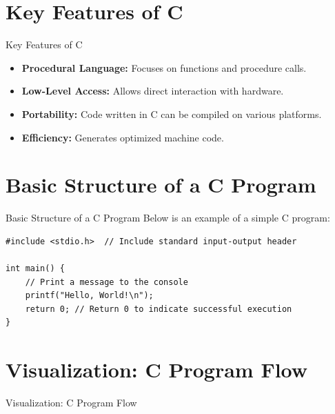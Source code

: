 \documentclass{beamer}
\begin{document}
\section{Key Features of C}
\begin{frame}{Key Features of C}
    \begin{itemize}
        \item \textbf{Procedural Language:} Focuses on functions and procedure calls.
        \item \textbf{Low-Level Access:} Allows direct interaction with hardware.
        \item \textbf{Portability:} Code written in C can be compiled on various platforms.
        \item \textbf{Efficiency:} Generates optimized machine code.
    \end{itemize}
\end{frame}

\section{Basic Structure of a C Program}
\begin{frame}[fragile]{Basic Structure of a C Program}
    Below is an example of a simple C program:
    \begin{lstlisting}
#include <stdio.h>  // Include standard input-output header

int main() {
    // Print a message to the console
    printf("Hello, World!\n");
    return 0; // Return 0 to indicate successful execution
}
    \end{lstlisting}
\end{frame}

\section{Visualization: C Program Flow}
\begin{frame}{Visualization: C Program Flow}
    \begin{center}
    \end{center}
    \caption{Flow of a C Program}
\end{frame}
\end{document}
